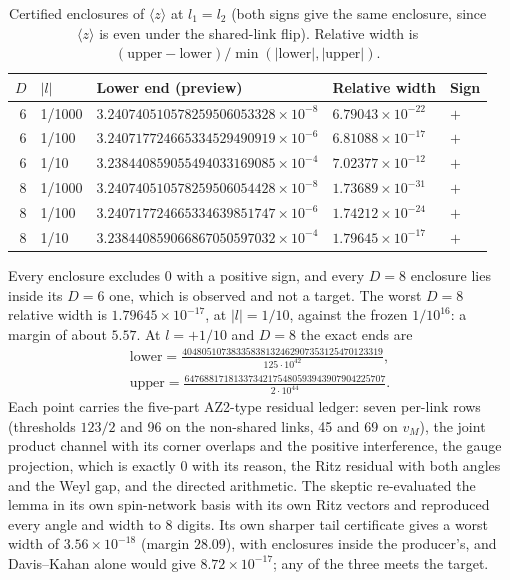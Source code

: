\begin{table}[htbp]
\centering\small
\caption{Certified enclosures of $\langle z\rangle$ at $l_1=l_2$ (both signs
give the same enclosure, since $\langle z\rangle$ is even under the shared-link
flip). Relative width is $(\text{upper}-\text{lower})/\min(|\text{lower}|,|\text{upper}|)$.}
\label{tab:bd2-enclosures}
\begin{tabular}{rllll}
\toprule
$D$ & $|l|$ & Lower end (preview) & Relative width & Sign\\
\midrule
6 & 1/1000 & $3.240740510578259506053328\times10^{-8}$ & $6.79043\times10^{-22}$ & $+$\\
6 & 1/100 & $3.240717724665334529490919\times10^{-6}$ & $6.81088\times10^{-17}$ & $+$\\
6 & 1/10 & $3.238440859055494033169085\times10^{-4}$ & $7.02377\times10^{-12}$ & $+$\\
8 & 1/1000 & $3.240740510578259506054428\times10^{-8}$ & $1.73689\times10^{-31}$ & $+$\\
8 & 1/100 & $3.240717724665334639851747\times10^{-6}$ & $1.74212\times10^{-24}$ & $+$\\
8 & 1/10 & $3.238440859066867050597032\times10^{-4}$ & $1.79645\times10^{-17}$ & $+$\\
\bottomrule
\end{tabular}
\end{table}

Every enclosure excludes 0 with a positive sign, and every $D=8$ enclosure
lies inside its $D=6$ one, which is observed and not a target. The worst
$D=8$ relative width is $1.79645\times10^{-17}$, at $|l|=1/10$, against the
frozen $1/10^{16}$: a margin of about $5.57$. At $l=+1/10$ and $D=8$ the exact
ends are
\begin{equation}
 \begin{gathered}
 \text{lower}=\frac{40480510738335838132462907353125470123319}{125\cdot10^{42}},\\
 \text{upper}=\frac{64768817181337342175480593943907904225707}{2\cdot10^{44}}.
 \end{gathered}
 \label{eq:bd2-ends}
\end{equation}
Each point carries the five-part AZ2-type residual ledger: seven per-link rows
(thresholds $123/2$ and 96 on the non-shared links, 45 and 69 on $v_M$), the
joint product channel with its corner overlaps and the positive interference,
the gauge projection, which is exactly 0 with its reason, the Ritz residual
with both angles and the Weyl gap, and the directed arithmetic. The skeptic
re-evaluated the lemma in its own spin-network basis with its own Ritz
vectors and reproduced every angle and width to 8 digits. Its own sharper
tail certificate gives a worst width of $3.56\times10^{-18}$ (margin
$28.09$), with enclosures inside the producer's, and Davis--Kahan alone would
give $8.72\times10^{-17}$; any of the three meets the target.

